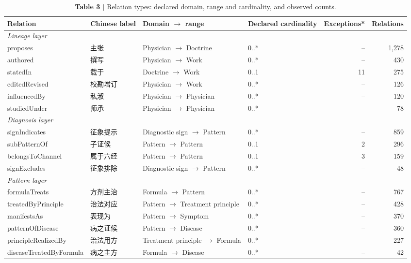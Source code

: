 \begin{table}[p]
\footnotesize
\begin{threeparttable}
\caption{\textbf{Table 3 $|$} Relation types: declared domain, range and cardinality, and observed counts.}
\begin{tabularx}{\linewidth}{llXlrr}
\toprule
Relation & Chinese label & Domain $\rightarrow$ range & Declared cardinality & Exceptions* & Relations \\
\midrule
\multicolumn{6}{l}{\textit{Lineage layer}} \\
proposes & 主张 & Physician $\rightarrow$ Doctrine & 0..* & -- & 1,278 \\
authored & 撰写 & Physician $\rightarrow$ Work & 0..* & -- & 430 \\
statedIn & 载于 & Doctrine $\rightarrow$ Work & 0..1 & 11 & 275 \\
editedRevised & 校勘增订 & Physician $\rightarrow$ Work & 0..* & -- & 126 \\
influencedBy & 私淑 & Physician $\rightarrow$ Physician & 0..* & -- & 120 \\
studiedUnder & 师承 & Physician $\rightarrow$ Physician & 0..* & -- & 78 \\
\multicolumn{6}{l}{\textit{Diagnosis layer}} \\
signIndicates & 征象提示 & Diagnostic sign $\rightarrow$ Pattern & 0..* & -- & 859 \\
subPatternOf & 子证候 & Pattern $\rightarrow$ Pattern & 0..1 & 2 & 296 \\
belongsToChannel & 属于六经 & Pattern $\rightarrow$ Pattern & 0..1 & 3 & 159 \\
signExcludes & 征象排除 & Diagnostic sign $\rightarrow$ Pattern & 0..* & -- & 48 \\
\multicolumn{6}{l}{\textit{Pattern layer}} \\
formulaTreats & 方剂主治 & Formula $\rightarrow$ Pattern & 0..* & -- & 767 \\
treatedByPrinciple & 治法对应 & Pattern $\rightarrow$ Treatment principle & 0..* & -- & 428 \\
manifestsAs & 表现为 & Pattern $\rightarrow$ Symptom & 0..* & -- & 370 \\
patternOfDisease & 病之证候 & Pattern $\rightarrow$ Disease & 0..* & -- & 360 \\
principleRealizedBy & 治法用方 & Treatment principle $\rightarrow$ Formula & 0..* & -- & 227 \\
diseaseTreatedByFormula & 病之主方 & Formula $\rightarrow$ Disease & 0..* & -- & 42 \\

\end{tabularx}
\end{threeparttable}
\end{table}
